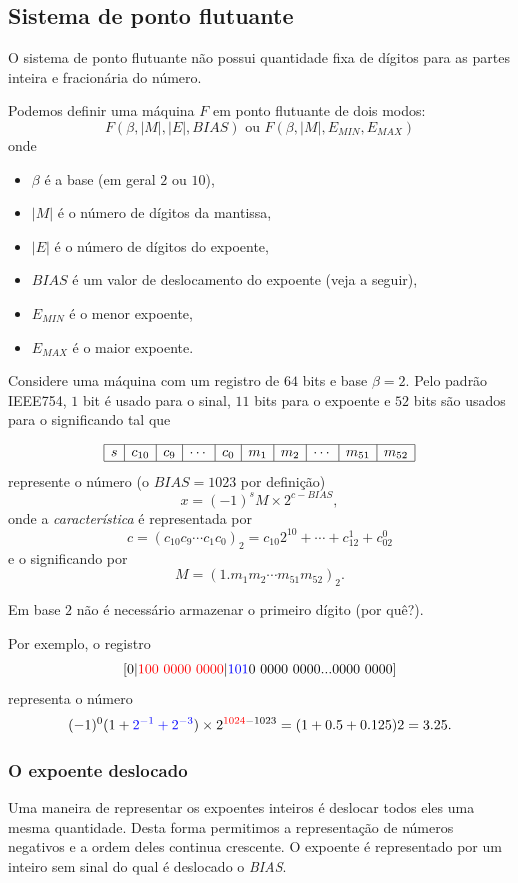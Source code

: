 \documentclass[main.tex]{subfiles}
\begin{document}
\subsection{Sistema de ponto flutuante}

O sistema de ponto flutuante não possui quantidade fixa de dígitos para as partes inteira e fracionária do número. 

Podemos definir uma máquina $F$ em ponto flutuante de dois modos:
$$ F(\beta,|M|,|E|,BIAS) \text{ ou } F(\beta,|M|,E_{MIN},E_{MAX})$$
onde
\begin{itemize}
 \item $\beta$ é a base (em geral $2$ ou $10$),
 \item $|M|$ é o número de dígitos da mantissa,
 \item $|E|$ é o número de dígitos do expoente,
 \item $BIAS$ é um valor de deslocamento do expoente (veja a seguir),
 \item $E_{MIN}$ é o menor expoente,
 \item $E_{MAX}$ é o maior expoente.
\end{itemize}



Considere uma máquina com um registro de $64$ bits e base $\beta=2$. Pelo padrão IEEE754, $1$ bit é usado para o sinal, $11$ bits para o expoente e $52$ bits são usados para o significando tal que 

$$
\begin{array}{|c|c|c|c|c|c|c|c|c|c|}
\hline
s&c_{10}&c_{9}&\cdots&c_{0}&m_1&m_2&\cdots &m_{51}&m_{52}\\
\hline
\end{array}
$$
represente o número (o $BIAS=1023$ por definição)
$$ x=(-1)^{s}M \times 2^{c-BIAS}, $$
onde a \emph{característica} é representada por
$$c=(c_{10}c_9\cdots c_1c_0)_2
   =c_{10}2^{10}+\cdots+c_12^1+c_02^0 $$
e o significando por
$$M=(1.m_1m_2\cdots m_{51}m_{52})_2.$$



Em base $2$ não é necessário armazenar o primeiro dígito (por quê?).

Por exemplo, o registro
$$
[0|{\color{red}{100~0000~0000}} |{\color{blue}{101}}0~0000~0000...0000~0000]
$$
representa o número
$$
(-1)^0(1+{\color{blue}{2^{-1}+2^{-3}}})\times  2^{{\color{red}{1024}}-1023}=(1+0.5+0.125)2=3.25.
$$



\subsubsection{O expoente deslocado}
Uma maneira de representar os expoentes inteiros é deslocar todos eles uma mesma quantidade. Desta forma permitimos a representação de números negativos e a ordem deles continua crescente. O expoente é representado por um inteiro sem sinal do qual é deslocado o \emph{BIAS}.
\end{document}
